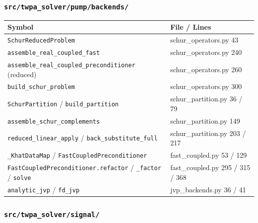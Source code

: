 \documentclass[
  10pt,
]{article}
\newcounter{none} %
\begin{document}
\subsubsection{\texorpdfstring{\texttt{src/twpa\_solver/pump/backends/}}{src/twpa\_solver/pump/backends/}}\label{srctwpa_solverpumpbackends}

{\def\LTcaptype{none} %
\begin{longtable}[]{@{}
  >{\raggedright\arraybackslash}p{}
  >{\raggedright\arraybackslash}p{}@{}}
\toprule\noalign{}
\begin{minipage}[b]{\linewidth}\raggedright
Symbol
\end{minipage} & \begin{minipage}[b]{\linewidth}\raggedright
File / Lines
\end{minipage} \\
\midrule\noalign{}
\endhead
\bottomrule\noalign{}
\endlastfoot
\texttt{SchurReducedProblem} & schur\_operators.py 43 \\
\texttt{assemble\_real\_coupled\_fast} & schur\_operators.py 240 \\
\texttt{assemble\_real\_coupled\_preconditioner} (reduced) &
schur\_operators.py 260 \\
\texttt{build\_schur\_problem} & schur\_operators.py 300 \\
\texttt{SchurPartition} / \texttt{build\_partition} &
schur\_partition.py 36 / 79 \\
\texttt{assemble\_schur\_complements} & schur\_partition.py 149 \\
\texttt{reduced\_linear\_apply} / \texttt{back\_substitute\_full} &
schur\_partition.py 203 / 217 \\
\texttt{\_KhatDataMap} / \texttt{FastCoupledPreconditioner} &
fast\_coupled.py 53 / 129 \\
\texttt{FastCoupledPreconditioner.refactor} / \texttt{\_factor} /
\texttt{solve} & fast\_coupled.py 295 / 315 / 368 \\
\texttt{analytic\_jvp} / \texttt{fd\_jvp} & jvp\_backends.py 36 / 41 \\
\end{longtable}
}

\subsubsection{\texorpdfstring{\texttt{src/twpa\_solver/signal/}}{src/twpa\_solver/signal/}}\label{srctwpa_solversignal}
\end{document}

